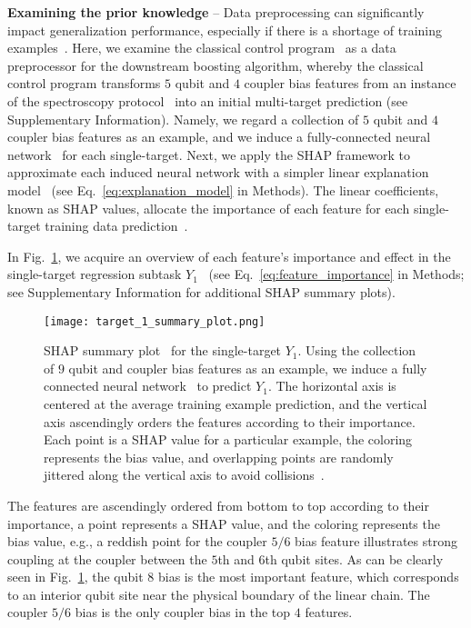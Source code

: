 \documentclass[aps,twocolumn,superscriptaddress,floatfix,preprintnumbers,showkeys]{revtex4}
\begin{document}
\textbf{Examining the prior knowledge} -- Data preprocessing can significantly impact generalization performance, especially if there is a shortage of training examples~\cite{Erhan_2010, Sklearn_2011}. Here, we examine the classical control program~\cite{Roushan_2017, Neill_2018, Chiaro_2019} as a data preprocessor for the downstream boosting algorithm, whereby the classical control program transforms $5$ qubit and $4$ coupler bias features from an instance of the spectroscopy protocol~\cite{Roushan_2017} into an initial multi-target prediction (see Supplementary Information). Namely, we regard a collection of $5$ qubit and $4$ coupler bias features as an example, and we induce a fully-connected neural network~\cite{Sklearn_2011} for each single-target. Next, we apply the SHAP framework to approximate each induced neural network with a simpler linear explanation model~\cite{Lundberg_2017} (see Eq.~\ref{eq:explanation_model} in Methods). The linear coefficients, known as SHAP values, allocate the importance of each feature for each single-target training data prediction~\cite{Lundberg_2017, Molnar_2020}. 

In Fig.~\ref{fig:shap}, we acquire an overview of each feature's importance and effect in the single-target regression subtask $Y_{1}$~\cite{Lundberg_2017, Molnar_2020} (see Eq.~\ref{eq:feature_importance} in Methods; see Supplementary Information for additional SHAP summary plots).
\begin{figure}
\centering
\texttt{[image: target\_1\_summary\_plot.png]}
\caption{SHAP summary plot~\cite{Lundberg_2017} for the single-target $Y_{1}.$ Using the collection of $9$ qubit and coupler bias features as an example, we induce a fully connected neural network~\cite{Sklearn_2011} to predict $Y_{1}.$ The horizontal axis is centered at the average training example prediction, and the vertical axis ascendingly orders the features according to their importance. Each point is a SHAP value for a particular example, the coloring represents the bias value, and overlapping points are randomly jittered along the vertical axis to avoid collisions~\cite{Lundberg_2017, Molnar_2020}.}
\label{fig:shap}
\end{figure}
The features are ascendingly ordered from bottom to top according to their importance, a point represents a SHAP value, and the coloring represents the bias value, e.g., a reddish point for the coupler $5/6$ bias feature illustrates strong coupling at the coupler between the $5$th and $6$th qubit sites. As can be clearly seen in Fig.~\ref{fig:shap}, the qubit $8$ bias is the most important feature, which corresponds to an interior qubit site near the physical boundary of the linear chain. The coupler $5/6$ bias is the only coupler bias in the top $4$ features. 
\end{document}

